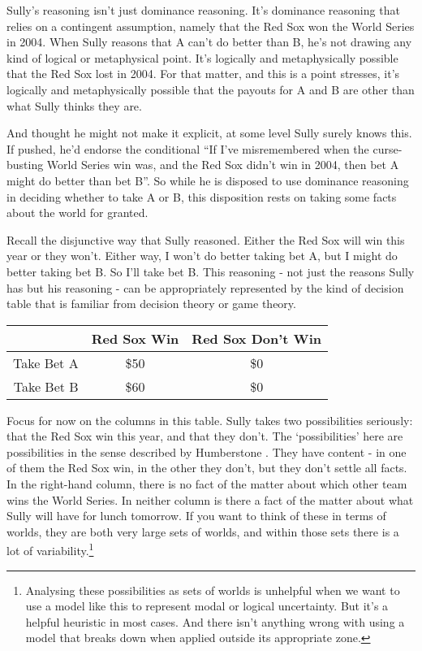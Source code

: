 \documentclass[
  11pt,
]{book}
\begin{document}
Sully's reasoning isn't just dominance reasoning. It's dominance reasoning that relies on a contingent assumption, namely that the Red Sox won the World Series in 2004. When Sully reasons that A can't do better than B, he's not drawing any kind of logical or metaphysical point. It's logically and metaphysically possible that the Red Sox lost in 2004. For that matter, and this is a point \citet{Ganson2019} stresses, it's logically and metaphysically possible that the payouts for A and B are other than what Sully thinks they are.

And thought he might not make it explicit, at some level Sully surely knows this. If pushed, he'd endorse the conditional ``If I've misremembered when the curse-busting World Series win was, and the Red Sox didn't win in 2004, then bet A might do better than bet B''. So while he is disposed to use dominance reasoning in deciding whether to take A or B, this disposition rests on taking some facts about the world for granted.

Recall the disjunctive way that Sully reasoned. Either the Red Sox will win this year or they won't. Either way, I won't do better taking bet A, but I might do better taking bet B. So I'll take bet B. This reasoning - not just the reasons Sully has but his reasoning - can be appropriately represented by the kind of decision table that is familiar from decision theory or game theory.

\begin{longtable}[]{@{}rcc@{}}
\toprule\noalign{}
~ & Red Sox Win & Red Sox Don't Win \\
\midrule\noalign{}
\endhead
\bottomrule\noalign{}
\endlastfoot
Take Bet A & \$50 & \$0 \\
Take Bet B & \$60 & \$0 \\
\end{longtable}

Focus for now on the columns in this table. Sully takes two possibilities seriously: that the Red Sox win this year, and that they don't. The `possibilities' here are possibilities in the sense described by Humberstone \citeyearpar{Humberstone1981}. They have content - in one of them the Red Sox win, in the other they don't, but they don't settle all facts. In the right-hand column, there is no fact of the matter about which other team wins the World Series. In neither column is there a fact of the matter about what Sully will have for lunch tomorrow. If you want to think of these in terms of worlds, they are both very large sets of worlds, and within those sets there is a lot of variability.\footnote{Analysing these possibilities as sets of worlds is unhelpful when we want to use a model like this to represent modal or logical uncertainty. But it's a helpful heuristic in most cases. And there isn't anything wrong with using a model that breaks down when applied outside its appropriate zone.}
\end{document}
